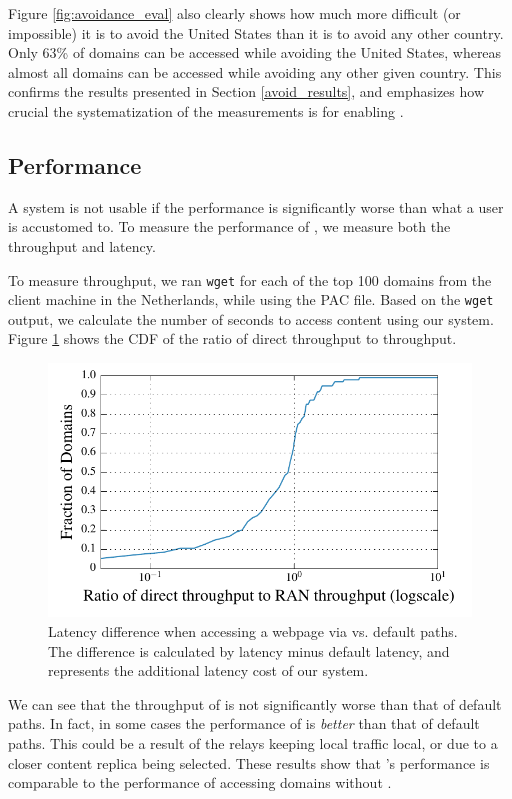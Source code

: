 Figure \ref{fig:avoidance_eval} also clearly shows how much more difficult (or 
impossible) it is to avoid the United States than it is to avoid any other 
country.  Only 63\% of domains can be accessed while avoiding the United States, 
whereas almost all domains can be accessed while avoiding any other given 
country.  This confirms the results presented in Section \ref{avoid_results}, and 
emphasizes how crucial the systematization of the measurements is for enabling 
\system{}.

\subsection{Performance}
A system is not usable if the performance is significantly worse than what a user
is accustomed to.  To measure the performance of \system{}, we measure both 
the throughput and latency.

To measure throughput, we ran {\tt wget} for each 
of the top 100 domains from the client machine in the Netherlands, while 
using the PAC file.  Based on the {\tt wget} output, we calculate the number 
of seconds to access content using our system. Figure \ref{fig:latency} shows 
the CDF of the ratio of direct throughput to \system{} throughput. 

\begin{figure}[t]
\centering
\includegraphics[width=.5\textwidth]{throughput}
\caption{Latency difference when accessing a webpage via \system{} vs. default paths. 
The difference is calculated by \system{} latency minus default latency, and represents 
the additional latency cost of our system.}
\label{fig:latency}
\end{figure}

We can see that the throughput of \system{} is not significantly worse than that 
of default paths.  In fact, in some cases the performance of \system{} is {\it 
better} than that of default paths.  This could be a result of the relays 
keeping local traffic local, or due to a closer content replica being selected. 
These results show that \system{}'s performance is comparable to the performance 
of accessing domains without \system{}.

